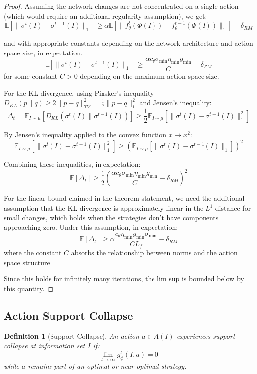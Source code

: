 \documentclass[12pt,a4paper]{article}
\newtheorem{definition}[theorem]{Definition}
\begin{document}
\begin{proof}
Assuming the network changes are not concentrated on a single action (which would require an additional regularity assumption), we get:
$$\mathbb{E}[\|\sigma^t(I) - \sigma^{t-1}(I)\|_1] \geq \alpha \mathbb{E}[\|f_\theta^t(\Phi(I)) - f_\theta^{t-1}(\Phi(I))\|_1] - \delta_{RM}$$

and with appropriate constants depending on the network architecture and action space size, in expectation:
$$\mathbb{E}[\|\sigma^t(I) - \sigma^{t-1}(I)\|_1] \geq \frac{\alpha c_\theta \sigma_{\min} \eta_{\min} g_{\min}}{C} - \delta_{RM}$$
for some constant $C > 0$ depending on the maximum action space size.

For the KL divergence, using Pinsker's inequality $D_{KL}(p \| q) \geq 2\|p - q\|_{TV}^2 = \frac{1}{2}\|p - q\|_1^2$ and Jensen's inequality:
$$\Delta_t = \mathbb{E}_{I \sim \mu}[D_{KL}(\sigma^t(I) \| \sigma^{t-1}(I))] \geq \frac{1}{2}\mathbb{E}_{I \sim \mu}[\|\sigma^t(I) - \sigma^{t-1}(I)\|_1^2]$$

By Jensen's inequality applied to the convex function $x \mapsto x^2$:
$$\mathbb{E}_{I \sim \mu}[\|\sigma^t(I) - \sigma^{t-1}(I)\|_1^2] \geq (\mathbb{E}_{I \sim \mu}[\|\sigma^t(I) - \sigma^{t-1}(I)\|_1])^2$$

Combining these inequalities, in expectation:
$$\mathbb{E}[\Delta_t] \geq \frac{1}{2}\left(\frac{\alpha c_\theta \sigma_{\min} \eta_{\min} g_{\min}}{C} - \delta_{RM}\right)^2$$

For the linear bound claimed in the theorem statement, we need the additional assumption that the KL divergence is approximately linear in the $L^1$ distance for small changes, which holds when the strategies don't have components approaching zero. Under this assumption, in expectation:
$$\mathbb{E}[\Delta_t] \geq \alpha \frac{c_\theta \eta_{\min} g_{\min} \sigma_{\min}}{CL_f} - \delta_{RM}$$
where the constant $C$ absorbs the relationship between norms and the action space structure.

Since this holds for infinitely many iterations, the lim sup is bounded below by this quantity.
\end{proof}

\subsection{Action Support Collapse}

\begin{definition}[Support Collapse]
An action $a \in A(I)$ experiences support collapse at information set $I$ if:
$$\lim_{t \rightarrow \infty} g_\phi^t(I, a) = 0$$
while $a$ remains part of an optimal or near-optimal strategy.
\end{definition}
\end{document}
